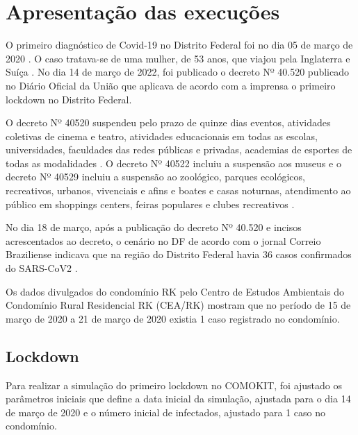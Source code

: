 \section{Apresentação das execuções}

O primeiro diagnóstico de Covid-19 no Distrito Federal foi no dia 05 de março de 2020 \cite{SESCovid19S7}. O caso tratava-se de uma mulher, de 53 anos, que viajou pela Inglaterra e Suíça \cite{Brasilco67:online}. No dia 14 de março de 2022, foi publicado o decreto Nº 40.520 publicado no Diário Oficial da União que aplicava de acordo com a imprensa \cite{CorreioBraziliense032020:online} o primeiro lockdown no Distrito Federal.

O decreto Nº 40520 suspendeu pelo prazo de quinze dias eventos, atividades coletivas de cinema e teatro, atividades educacionais em todas as escolas, universidades, faculdades das redes públicas e privadas, academias de esportes de todas as modalidades \cite{Brasilco67:online}. O decreto Nº 40522 incluiu a suspensão aos museus \cite{Decreto441:online} e o decreto Nº 40529 incluiu a suspensão ao zoológico, parques ecológicos, recreativos, urbanos, vivenciais e afins e boates e casas noturnas, atendimento ao público em shoppings centers, feiras populares e clubes recreativos \cite{Decreto412:online}.

No dia 18 de março, após a publicação do decreto Nº 40.520 e incisos acrescentados ao decreto, o cenário no DF de acordo com o jornal Correio Braziliense indicava que na região do Distrito Federal havia 36 casos confirmados do SARS-CoV2 \cite{CorreioBraziliense032020:online}.

Os dados divulgados do condomínio RK pelo Centro de Estudos Ambientais do Condomínio Rural Residencial RK (CEA/RK) mostram que no período de 15 de março de 2020 a 21 de março de 2020 existia 1 caso registrado no condomínio.



\subsection{Lockdown}

Para realizar a simulação do primeiro lockdown no COMOKIT, foi ajustado os parâmetros iniciais que define a data inicial da simulação, ajustada para o dia 14 de março de 2020 e o número inicial de infectados, ajustado para 1 caso no condomínio.

